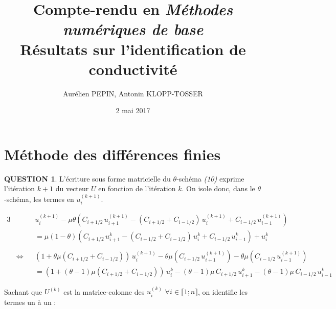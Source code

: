\documentclass[a4paper,11pt]{article}
\title{Compte-rendu en \textit{Méthodes numériques de base} \\
\textbf{Résultats sur l'identification de conductivité}}
\author{Aurélien PEPIN, Antonin KLOPP-TOSSER}
\date{2 mai 2017}
\newcommand{\quest}[1]{\small\textbf{#1}\normalsize}
\theoremstyle{nonumberplain}
\begin{document}
\maketitle

\section{Méthode des différences finies}

    \quest{QUESTION 1}. L'écriture sous forme matricielle du $\theta$-schéma \textit{(10)} exprime l'itération $k + 1$ du vecteur $U$ en fonction de l'itération $k$.
    On isole donc, dans le $\theta$-schéma, les termes en $u_{i}^{(k + 1)}$.

    \begin{calculs}
        \begin{alignat*}{3}
            & & & u_{i}^{(k + 1)} - \mu\theta\left(C_{i + 1/2}\,u_{i + 1}^{(k + 1)} - (C_{i + 1/2} + C_{i - 1/2})\,u_{i}^{(k + 1)} + C_{i - 1/2}\,u_{i - 1}^{(k + 1)}\right) \\
            & & & = \mu(1 - \theta)\left(C_{i + 1/2}\,u_{i + 1}^{k} - (C_{i + 1/2} + C_{i - 1/2})\,u_{i}^{k} + C_{i - 1/2}\,u_{i - 1}^{k}\right) + u_{i}^{k} \\
            & & & \\
            & \iff & & \left(1+\theta\mu(C_{i + 1/2} + C_{i - 1/2})\right)\,u_{i}^{(k + 1)} - \theta\mu(C_{i + 1/2}\,u_{i + 1}^{(k + 1)}) - \theta\mu(C_{i - 1/2}\,u_{i - 1}^{(k + 1)}) \\
            & & & = \left(1 + (\theta - 1)\mu(C_{i + 1/2} + C_{i - 1/2})\right)\,u_{i}^{k} - (\theta - 1)\mu\,C_{i + 1/2}\,u_{i + 1}^{k} - (\theta - 1)\mu\,C_{i - 1/2}\,u_{i - 1}^{k}
        \end{alignat*}
    \end{calculs}

    Sachant que $U^{(k)}$ est la matrice-colonne des $u_{i}^{(k)}$ $\forall i \in \llbracket 1; n \rrbracket$, on identifie les termes un à un :
\end{document}
